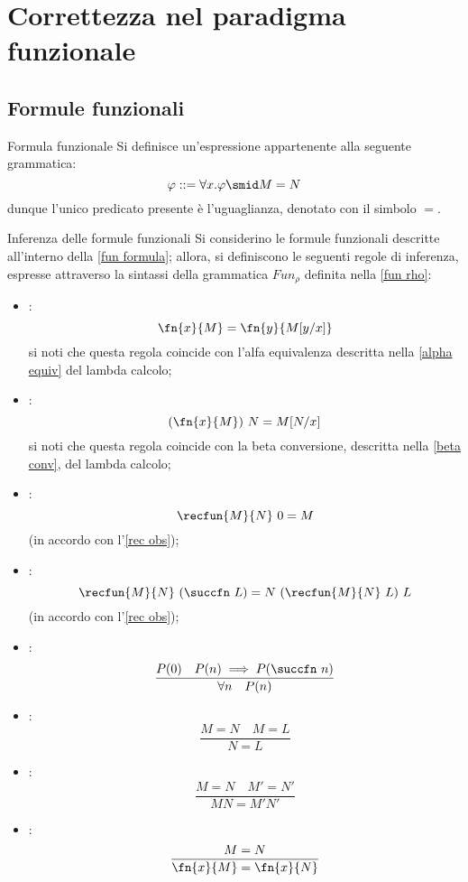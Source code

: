 \documentclass[a4paper, 12pt]{report}
\begin{document}
    \section{Correttezza nel paradigma funzionale}

    \subsection{Formule funzionali}

    \begin{frameddefn}[label={fun formula}]{Formula funzionale}
        Si definisce  un'espressione appartenente alla seguente grammatica: $$\varphi ::= \forall x.\varphi \smid M = N$$ dunque l'unico predicato presente è l'uguaglianza, denotato con il simbolo $=$.
    \end{frameddefn}

    \begin{framedprop}[breakable]{Inferenza delle formule funzionali}
        Si considerino le formule funzionali descritte all'interno della \cref{fun formula}; allora, si definiscono le seguenti regole di inferenza, espresse attraverso la sintassi della grammatica $Fun_\rho$ definita nella \cref{fun rho}:

        \begin{itemize}
            \item {}: $$\fn{x}{M} = \fn{y}{M[y/x]}$$ si noti che questa regola coincide con l'alfa equivalenza descritta nella \cref{alpha equiv} del lambda calcolo;
            \item {}: $$(\fn{x}{M})\ N = M[N/x]$$ si noti che questa regola coincide con la beta conversione, descritta nella \cref{beta conv}, del lambda calcolo;
            \item {}: $$\recfun{M}{N} \ 0 = M$$ (in accordo con l'\cref{rec obs});
            \item {}: $$\recfun{M}{N} \ (\succfn \ L) = N \ (\recfun{M}{N} \ L) \ L$$ (in accordo con l'\cref{rec obs});
            \item {}: $$\dfrac{P(0) \quad P(n) \implies P(\succfn \ n)}{\forall n \quad P(n)}$$
            \item {}: $$\dfrac{M = N \quad M = L}{N = L}$$
            \item {}: $$\dfrac{M = N \quad M' = N'}{MN = M'N'}$$
            \item {}: $$\dfrac{M= N}{\fn{x}{M} = \fn{x}{N}}$$
        \end{itemize}
    \end{framedprop}
\end{document}
